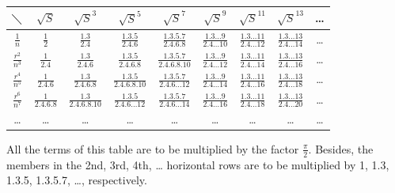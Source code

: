 \documentclass[11pt]{article}
\begin{document}
\begin{center}
\renewcommand{\arraystretch}{1.8}
\begin{tabular}{|c||c|c|c|c|c|c|c|c|}
\hline
$\diagdown$ & $\sqrt{S}$ & $\sqrt{S}^{3}$ & $\sqrt{S}^{5}$ & $\sqrt{S}^{7}$ & $\sqrt{S}^{9}$ & $\sqrt{S}^{11}$ & $\sqrt{S}^{13}$ & \dots \\
\hline\hline
$\frac{1}{n}$ & $\frac{1}{2}$ & $\frac{1.3}{2.4}$ & $\frac{1.3.5}{2.4.6}$ & $\frac{1.3.5.7}{2.4.6.8}$ & $\frac{1.3\ldots 9}{2.4\ldots 10}$ & $\frac{1.3\ldots 11}{2.4\ldots 12}$ & $\frac{1.3\ldots 13}{2.4\ldots 14}$ & \dots \\
\hline
$\frac{r^2}{n^3}$ & $\frac{1}{2.4}$ & $\frac{1.3}{2.4.6}$ & $\frac{1.3.5}{2.4.6.8}$ & $\frac{1.3.5.7}{2.4.6.8.10}$ & $\frac{1.3\ldots 9}{2.4\ldots 12}$ & $\frac{1.3\ldots 11}{2.4\ldots 14}$ & $\frac{1.3\ldots 13}{2.4\ldots 16}$ & \dots \\
\hline
$\frac{r^4}{n^5}$ & $\frac{1}{2.4.6}$ & $\frac{1.3}{2.4.6.8}$ & $\frac{1.3.5}{2.4.6.8.10}$ & $\frac{1.3.5.7}{2.4.6\ldots 12}$ & $\frac{1.3\ldots 9}{2.4\ldots 14}$ & $\frac{1.3\ldots 11}{2.4\ldots 16}$ & $\frac{1.3\ldots 13}{2.4\ldots 18}$ & \dots \\
\hline
$\frac{r^6}{n^7}$ & $\frac{1}{2.4.6.8}$ & $\frac{1.3}{2.4.6.8.10}$ & $\frac{1.3.5}{2.4.6\ldots 12}$ & $\frac{1.3.5.7}{2.4.6\ldots 14}$ & $\frac{1.3\ldots 9}{2.4\ldots 16}$ & $\frac{1.3\ldots 11}{2.4\ldots 18}$ & $\frac{1.3\ldots 13}{2.4\ldots 20}$ & \dots \\
\hline
\dots & \dots & \dots & \dots & \dots & \dots & \dots & \dots & \dots \\
\hline
\end{tabular}
\end{center}

All the terms of this table are to be multiplied by the factor $\frac{\pi}{2}$. Besides, the members in the 2nd, 3rd, 4th, \dots{} horizontal rows are to be multiplied by 1, 1.3, 1.3.5, 1.3.5.7, \dots, respectively.
\end{document}
